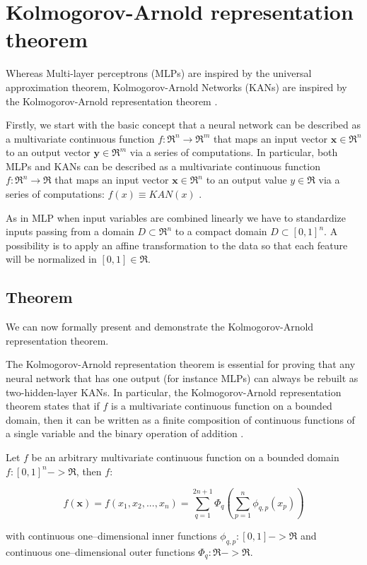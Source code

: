 \section{Kolmogorov-Arnold representation theorem}
\label{sec:ka}
Whereas Multi-layer perceptrons (MLPs) are inspired by the universal approximation theorem, Kolmogorov-Arnold Networks (KANs) are inspired by the Kolmogorov-Arnold representation theorem \cite{KAN}.

Firstly, we start with the basic concept that a neural network can be described as a multivariate continuous function $f: \Re^n \rightarrow \Re^m $ that maps an input vector $\textbf{x}\in \Re^n$ to an output vector $\textbf{y}\in \Re^m$ via a series of computations. In particular, both MLPs and KANs can be described as a multivariate continuous function $f: \Re^n \rightarrow \Re $ that maps an input vector $\textbf{x}\in \Re^n$ to an output value $y\in \Re$ via a series of computations: $f(x) \equiv KAN(x)$ \cite{book1NAML, book2NAML}.

As in MLP when input variables are combined linearly we have to standardize inputs passing from a domain $D \subset \Re^n$ to a compact domain $D \subset [0,1]^n $. A possibility is to apply an affine transformation to the data so that each feature will be normalized in $[0,1] \in 
 \Re$.

\subsection{Theorem}
We can now formally present and demonstrate the Kolmogorov-Arnold representation theorem. 

The Kolmogorov-Arnold representation theorem is essential for proving that any neural network that has one output (for instance MLPs) can always be rebuilt as two-hidden-layer KANs. In particular, the Kolmogorov-Arnold representation theorem states that if $f$ is a multivariate continuous function on a bounded domain, then it can be written as a finite composition of continuous functions of a single variable and the binary operation of addition \cite{KAtheorem, KArevisited}.

\begin{theorem} 
\label{Kolmogorov-Arnold}
Let $f$ be an arbitrary multivariate continuous function on a bounded domain $f:[0,1]^n -> \Re$, then $f$:

$$f(\textbf{x}) = f(x_1,x_2,...,x_n) = \sum_{q=1}^{2n+1} \Phi_q(\sum_{p=1}^n \phi_{q,p}(x_p))$$

with continuous one–dimensional inner functions $\phi_{q,p}:[0,1] -> \Re$ and continuous one–dimensional outer functions $\Phi_q:\Re -> \Re$.
\end{theorem} 


